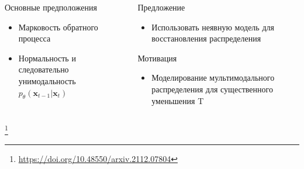 \documentclass[8pt]{beamer}
\newcommand\blfootnote[1]{%
	\begingroup
	\renewcommand\thefootnote{}\footnote{#1}%
	\addtocounter{footnote}{-1}%
	\endgroup
}
\begin{document}
\begin{frame}
\begin{columns}
\begin{column}{0.55\textwidth}
		\end{column}
	\end{columns}


\begin{columns}
	\begin{column}{0.4\textwidth}
		
		\begin{block}{Основные предположения}
			
			\begin{itemize}	
				\item Марковость обратного процесса
				\item Нормальность и следовательно унимодальность $p_\theta(\textbf{x}_{t-1}|\textbf{x}_t)$
			\end{itemize}
		
		\end{block}
	
	\end{column}
	
	\begin{column}{0.57\textwidth}  
			\begin{block}{Предложение}
				\begin{itemize}
					\item Использовать неявную модель для восстановления распределения
				\end{itemize}
			\end{block}	
		\begin{block}{Мотивация}
			\begin{itemize}
				\item Моделирование мультимодального распределения для существенного уменьшения T
			\end{itemize}
		\end{block}	
	\end{column}
\end{columns}
			\blfootnote{\url{https://doi.org/10.48550/arxiv.2112.07804}}
\end{frame}
\end{document}

